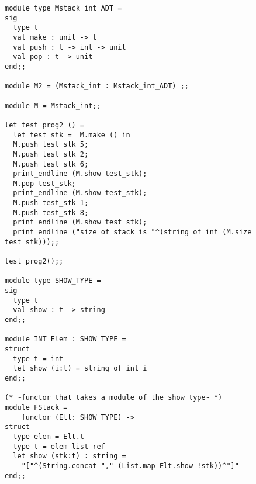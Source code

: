 \documentclass[fontsize=10pt]{slnotes}
\begin{document}
\begin{lstlisting}[escapechar=\~,escapebegin=\rmfamily,language={[Objective]Caml}]
module type Mstack_int_ADT =
sig
  type t
  val make : unit -> t
  val push : t -> int -> unit
  val pop : t -> unit
end;;

module M2 = (Mstack_int : Mstack_int_ADT) ;;

module M = Mstack_int;;

let test_prog2 () =
  let test_stk =  M.make () in
  M.push test_stk 5;
  M.push test_stk 2;
  M.push test_stk 6;
  print_endline (M.show test_stk);
  M.pop test_stk;
  print_endline (M.show test_stk);
  M.push test_stk 1;
  M.push test_stk 8;
  print_endline (M.show test_stk);
  print_endline ("size of stack is "^(string_of_int (M.size test_stk)));;

test_prog2();;

module type SHOW_TYPE =
sig
  type t
  val show : t -> string
end;;

module INT_Elem : SHOW_TYPE =
struct
  type t = int
  let show (i:t) = string_of_int i
end;;

(* ~functor that takes a module of the show type~ *)
module FStack =
    functor (Elt: SHOW_TYPE) ->
struct
  type elem = Elt.t
  type t = elem list ref
  let show (stk:t) : string =
    "["^(String.concat "," (List.map Elt.show !stk))^"]"
end;;
\end{lstlisting}
\end{document}
